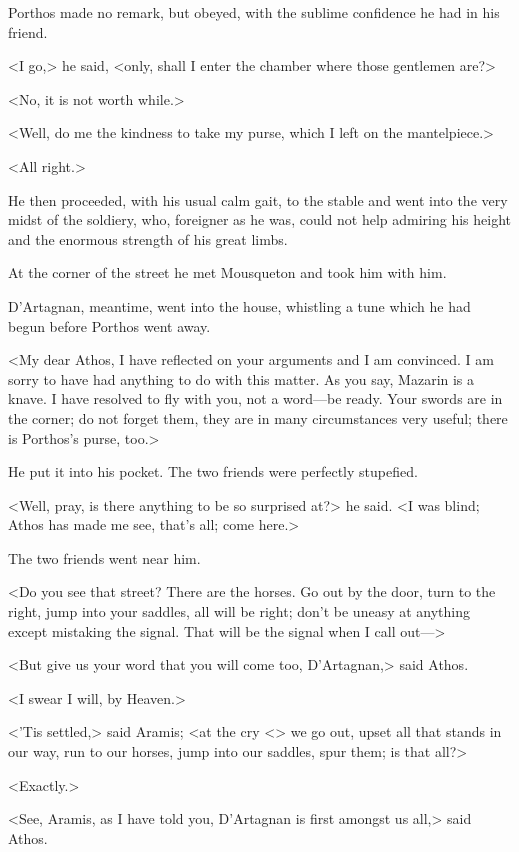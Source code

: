 Porthos made no remark, but obeyed, with the sublime confidence he had in his friend.

<I go,> he said, <only, shall I enter the chamber where those gentlemen are?>

<No, it is not worth while.>

<Well, do me the kindness to take my purse, which I left on the mantelpiece.>

<All right.>

He then proceeded, with his usual calm gait, to the stable and went into the very midst of the soldiery, who, foreigner as he was, could not help admiring his height and the enormous strength of his great limbs.

At the corner of the street he met Mousqueton and took him with him.

D'Artagnan, meantime, went into the house, whistling a tune which he had begun before Porthos went away.

<My dear Athos, I have reflected on your arguments and I am convinced. I am sorry to have had anything to do with this matter. As you say, Mazarin is a knave. I have resolved to fly with you, not a word—be ready. Your swords are in the corner; do not forget them, they are in many circumstances very useful; there is Porthos's purse, too.>

He put it into his pocket. The two friends were perfectly stupefied.

<Well, pray, is there anything to be so surprised at?> he said. <I was blind; Athos has made me see, that's all; come here.>

The two friends went near him.

<Do you see that street? There are the horses. Go out by the door, turn to the right, jump into your saddles, all will be right; don't be uneasy at anything except mistaking the signal. That will be the signal when I call out—>

<But give us your word that you will come too, D'Artagnan,> said Athos.

<I swear I will, by Heaven.>

<'Tis settled,> said Aramis; <at the cry <> we go out, upset all that stands in our way, run to our horses, jump into our saddles, spur them; is that all?>

<Exactly.>

<See, Aramis, as I have told you, D'Artagnan is first amongst us all,> said Athos.

